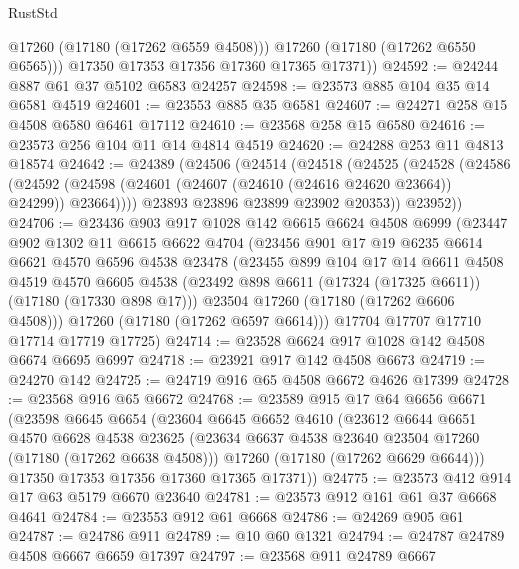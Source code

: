 \begin{lexlean}{RustStd}
\begin{coremodule}
{\begin{coremodule}
{{{{{{{{{{{{{{{{{{{{{{{{{{{{{{{{{{{{{{{{{{{{{{{{{{{{{{{            @17260
            (@17180 (@17262 @6559 @4508)))
          @17260
          (@17180 (@17262 @6550 @6565)))
        @17350
        @17353
        @17356
        @17360
        @17365
        @17371))
@24592 := @24244 @887 @61 @37 @5102 @6583 @24257
@24598 := @23573 @885 @104 @35 @14 @6581 @4519
@24601 := @23553 @885 @35 @6581
@24607 := @24271 @258 @15 @4508 @6580 @6461 @17112
@24610 := @23568 @258 @15 @6580
@24616 := @23573 @256 @104 @11 @14 @4814 @4519
@24620 := @24288 @253 @11 @4813 @18574
@24642 := @24389
    (@24506
      (@24514
        (@24518
          (@24525
            (@24528
              (@24586
                (@24592 (@24598 (@24601 (@24607 (@24610 (@24616 @24620 @23664)) @24299)) @23664))))
            @23893
            @23896
            @23899
            @23902
            @20353))
        @23952))
@24706 := @23436
    @903
    @917
    @1028
    @142
    @6615
    @6624
    @4508
    @6999
    (@23447
      @902
      @1302
      @11
      @6615
      @6622
      @4704
      (@23456
        @901
        @17
        @19
        @6235
        @6614
        @6621
        @4570
        @6596
        @4538
        @23478
        (@23455
          @899
          @104
          @17
          @14
          @6611
          @4508
          @4519
          @4570
          @6605
          @4538
          (@23492 @898 @6611 (@17324 (@17325 @6611)) (@17180 (@17330 @898 @17)))
          @23504
          @17260
          (@17180 (@17262 @6606 @4508)))
        @17260
        (@17180 (@17262 @6597 @6614)))
      @17704
      @17707
      @17710
      @17714
      @17719
      @17725)
@24714 := @23528 @6624 @917 @1028 @142 @4508 @6674 @6695 @6997
@24718 := @23921 @917 @142 @4508 @6673
@24719 := @24270 @142
@24725 := @24719 @916 @65 @4508 @6672 @4626 @17399
@24728 := @23568 @916 @65 @6672
@24768 := @23589
    @915
    @17
    @64
    @6656
    @6671
    (@23598
      @6645
      @6654
      (@23604
        @6645
        @6652
        @4610
        (@23612
          @6644
          @6651
          @4570
          @6628
          @4538
          @23625
          (@23634 @6637 @4538 @23640 @23504 @17260 (@17180 (@17262 @6638 @4508)))
          @17260
          (@17180 (@17262 @6629 @6644)))
        @17350
        @17353
        @17356
        @17360
        @17365
        @17371))
@24775 := @23573 @412 @914 @17 @63 @5179 @6670 @23640
@24781 := @23573 @912 @161 @61 @37 @6668 @4641
@24784 := @23553 @912 @61 @6668
@24786 := @24269 @905 @61
@24787 := @24786 @911
@24789 := @10 @60 @1321
@24794 := @24787 @24789 @4508 @6667 @6659 @17397
@24797 := @23568 @911 @24789 @6667
}}}}}}}}}}}}}}}}}}}}}}}}}}}}}}}}}}}}}}}}}}}}}}}}}}}}}}}
\end{coremodule}}
\end{coremodule}
\end{lexlean}
